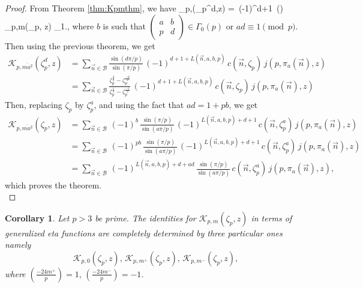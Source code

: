 \documentclass[12pt]{amsart}
\newtheorem{cor}[theorem]{Corollary}
\theoremstyle{definition}
\theoremstyle{remark}
\numberwithin{equation}{section}
\newcommand\Lpar[1]{\left(#1\right)}
\newcommand\stroke[3]{#1\,\left\arrowvert\,\left[#2\right]_{#3}\right.}
\newcommand\thm[1]{\ref{thm:#1}}
\begin{document}
\begin{proof}
From Theorem \thm{Kpmthm}, we have
\beq
{}_{p,}(\zeta_p^d,z)
= \,(-1)^{d+1}\,
\exp\Lpar{}\,\stroke{_{p,m}(\zeta_p, z)}{A}{1},
\nonumber
\eeq
where $b$ is such that $\begin{pmatrix}
      a & b \\ p & d 
    \end{pmatrix}
\in \Gamma_0(p)$ or $ad \equiv 1 \pmod{p}$.
Then using the previous theorem, we get
\begin{align*}
\mathcal{K}_{p,\overline{ma^2}}(\zeta_p^d,z)
&= \sum\limits_{\overrightarrow{n} \in \mathcal{B}} \frac{\sin(d\pi/p)}{\sin(\pi/p)}\,(-1)^{d+1+L(\overrightarrow{n},a,b,p)}\,c(\overrightarrow{n},\zeta_p)\, j(p,\pi_a(\overrightarrow{n}),z)
\\
&= \sum\limits_{\overrightarrow{n} \in \mathcal{B}} \frac{\zeta_p^{\frac{d}{2}}-\zeta_p^{\frac{-d}{2}}}{\zeta_p^{\frac{1}{2}}-\zeta_p^{\frac{-1}{2}}}\,(-1)^{d+1+L(\overrightarrow{n},a,b,p)}\,c(\overrightarrow{n},\zeta_p)\, j(p,\pi_a(\overrightarrow{n}),z)
\end{align*}
Then, replacing $\zeta_p$ by $\zeta_p^a$, and using the fact that $ad=1+pb$, we get
\\
\begin{align*}
\mathcal{K}_{p,\overline{ma^2}}(\zeta_p,z)&=\sum\limits_{\overrightarrow{n} \in \mathcal{B}}\,(-1)^b\,\frac{\sin(\pi/p)}{\sin(a\pi/p)}\,(-1)^{L(\overrightarrow{n},a,b,p)+d+1}\,c(\overrightarrow{n},\zeta_p^a)\, j(p,\pi_a(\overrightarrow{n}),z)
\\
&=\sum\limits_{\overrightarrow{n} \in \mathcal{B}}\,(-1)^{pb}\,\frac{\sin(\pi/p)}{\sin(a\pi/p)}\,(-1)^{L(\overrightarrow{n},a,b,p)+d+1}\,c(\overrightarrow{n},\zeta_p^a)\, j(p,\pi_a(\overrightarrow{n}),z)
\\
&=\sum\limits_{\overrightarrow{n} \in \mathcal{B}}\,(-1)^{L(\overrightarrow{n},a,b,p)+d+ad}\,\frac{\sin(\pi/p)}{\sin(a\pi/p)}\,c(\overrightarrow{n},\zeta_p^a)\, j(p,\pi_a(\overrightarrow{n}),z),
\end{align*}
which proves the theorem.\\
\end{proof}


\begin{cor}\label{cor:resnonres}
Let $p>3$ be prime. The identities for $\mathcal{K}_{p,m}(\zeta_{p},z)$ in terms of generalized eta functions are completely determined by three particular ones namely $$\mathcal{K}_{p,0}(\zeta_{p},z),\, \mathcal{K}_{p,m^+}(\zeta_{p},z), \, \mathcal{K}_{p,m^-}(\zeta_{p},z),$$ where $\left(\frac{-24m^+}{p}\right)=1,\, \left(\frac{-24m^-}{p}\right)=-1$.\\
\end{cor}
\end{document}
